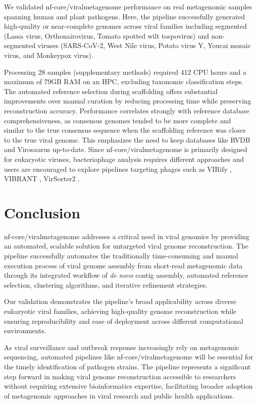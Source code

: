 We validated nf-core/viralmetagenome performance on real metagenomic samples spanning human and plant pathogens. Here, the pipeline successfully generated high-quality or near-complete genomes across viral families including segmented (Lassa virus, Orthonairovirus, Tomato spotted wilt tospovirus) and non-segmented viruses (SARS-CoV-2, West Nile virus, Potato virus Y, Youcai mosaic virus, and Monkeypox virus).

Processing 28 samples (supplementary methods) required 412 CPU hours and a maximum of 79GB RAM on an HPC, excluding taxonomic classification steps. The automated reference selection during scaffolding offers substantial improvements over manual curation by reducing processing time while preserving reconstruction accuracy. Performance correlates strongly with reference database comprehensiveness, as consensus genomes tended to be more complete and similar to the true consensus sequence when the scaffolding reference was closer to the true viral genome. This emphasizes the need to keep databases like RVDB \cite{Goodacre2018-dw} and Virosaurus \cite{Gleizes2020-rq} up-to-date. Since nf-core/viralmetagenome is primarily designed for eukaryotic viruses, bacteriophage analysis requires different approaches and users are encouraged to explore pipelines targeting phages such as VIRify \cite{Rangel-Pineros2022-wv}, VIBRANT \cite{Kieft2020-aq}, VirSorter2 \cite{Guo2021-rf}.


\section{Conclusion}

nf-core/viralmetagenome addresses a critical need in viral genomics by providing an automated, scalable solution for untargeted viral genome reconstruction. The pipeline successfully automates the traditionally time-consuming and manual execution process of viral genome assembly from short-read metagenomic data through its integrated workflow of \textit{de novo} contig assembly, automated reference selection, clustering algorithms, and iterative refinement strategies.

Our validation demonstrates the pipeline's broad applicability across diverse eukaryotic viral families, achieving high-quality genome reconstruction while ensuring reproducibility and ease of deployment across different computational environments.

As viral surveillance and outbreak response increasingly rely on metagenomic sequencing, automated pipelines like nf-core/viralmetagenome will be essential for the timely identification of pathogen strains. The pipeline represents a significant step forward in making viral genome reconstruction accessible to researchers without requiring extensive bioinformatics expertise, facilitating broader adoption of metagenomic approaches in viral research and public health applications.


